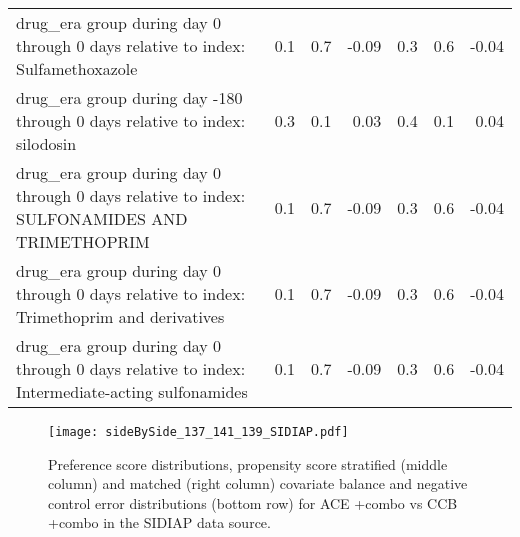 \documentclass[11pt,]{article}
\begin{document}
\begin{longtable}{p{30em}rrrrrr}
  drug\_era group during day 0 through 0 days relative to index: Sulfamethoxazole & 0.1 & 0.7 & -0.09 & 0.3 & 0.6 & -0.04 \\ 
  drug\_era group during day -180 through 0 days relative to index: silodosin & 0.3 & 0.1 & 0.03 & 0.4 & 0.1 & 0.04 \\ 
  drug\_era group during day 0 through 0 days relative to index: SULFONAMIDES AND TRIMETHOPRIM & 0.1 & 0.7 & -0.09 & 0.3 & 0.6 & -0.04 \\ 
  drug\_era group during day 0 through 0 days relative to index: Trimethoprim and derivatives & 0.1 & 0.7 & -0.09 & 0.3 & 0.6 & -0.04 \\ 
  drug\_era group during day 0 through 0 days relative to index: Intermediate-acting sulfonamides & 0.1 & 0.7 & -0.09 & 0.3 & 0.6 & -0.04 \\ 
  \bottomrule
\end{longtable}
\clearpage\begin{figure}[H]
    \caption{Preference score distributions,
    propensity score stratified (middle column) and matched (right column) covariate balance
    and negative control error distributions (bottom row) for
    ACE +combo vs CCB +combo in the SIDIAP data source.}
    \centerline{
        \texttt{[image: sideBySide\_137\_141\_139\_SIDIAP.pdf]}
    }
\end{figure}
\end{document}
